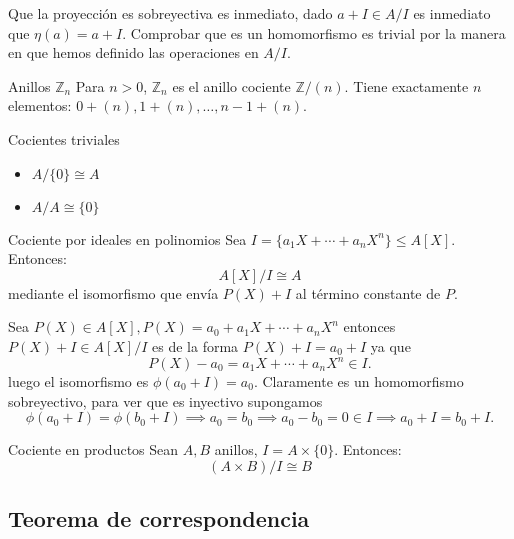 \begin{proofbox}
    Que la proyección es sobreyectiva es inmediato, dado $a + I \in A/I$ es inmediato que $\eta(a) = a + I$. Comprobar que es un homomorfismo es trivial por la manera en que hemos definido las operaciones en $A/I$.
\end{proofbox}

\begin{example}{Anillos \(\mathbb{Z}_n\)}{}
    Para \(n > 0\), \(\mathbb{Z}_n\)  es el anillo cociente \(\mathbb{Z}/(n)\). Tiene exactamente \(n\) elementos: \(0 + (n), 1 + (n), \ldots, n-1 + (n)\).
\end{example}

\begin{example}{Cocientes triviales}{}
    \begin{itemize}
        \item \(A/\{0\} \cong A\)
        \item \(A/A \cong \{0\}\)
    \end{itemize}
\end{example}

\begin{example}{Cociente por ideales en polinomios}{}
    Sea \(I = \{a_1X + \cdots + a_nX^n\} \leq A[X]\). Entonces:
    \[
    A[X]/I \cong A
    \]
    mediante el isomorfismo que envía \(P(X) + I\) al término constante de \(P\).
\end{example}

\begin{proofbox}
    Sea $P(X) \in A[X], P(X) = a_0 + a_1 X + \cdots + a_n X^n$ entonces $P(X) + I \in A[X]/I$ es de la forma $P(X) + I = a_0 + I$ ya que
    \[
    P(X) - a_0 = a_1 X + \cdots + a_n X^n \in I.
    \]
    luego el isomorfismo es $\phi(a_0 + I) = a_0$. Claramente es un homomorfismo sobreyectivo, para ver que es inyectivo supongamos
    \[
    \phi(a_0 + I) = \phi(b_0 + I) \implies a_0 = b_0 \implies a_0 - b_0 = 0 \in I \implies a_0 + I = b_0 + I.
    \]
\end{proofbox}

\begin{example}{Cociente en productos}{}
    Sean \(A, B\) anillos, \(I = A \times \{0\}\). Entonces:
    \[
    (A \times B)/I \cong B
    \]
\end{example}

\subsection{Teorema de correspondencia}

